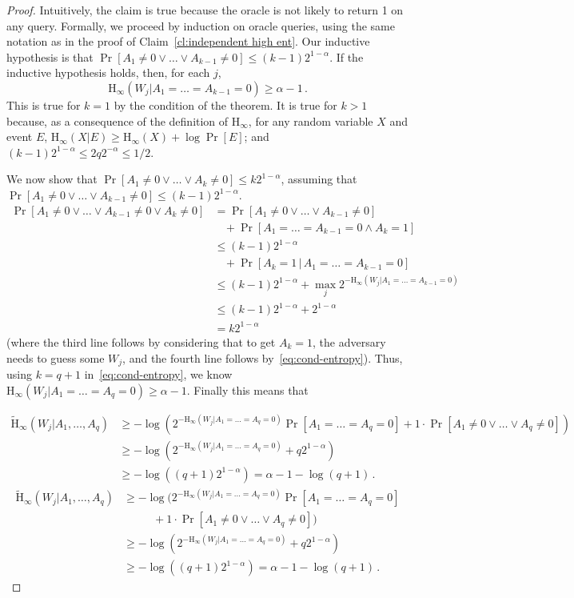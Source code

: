 \documentclass[11pt]{article}
\newcommand{\clref}[1]{\mbox{Claim~\ref{#1}}}
\newcommand{\Hoo}{\mathrm{H}_\infty}
\newcommand{\Hav}{\tilde{\mathrm{H}}_\infty}
\begin{document}
\begin{proof}
Intuitively, the claim is true because the oracle is not likely to return 1 on any query. Formally, we proceed by induction on oracle queries,
using the same notation as in the proof of   \clref{cl:independent high ent}. Our inductive hypothesis is
that $\Pr[A_1\neq 0 \vee \dots \vee A_{k-1}\neq 0] \leq (k-1)2^{1-\alpha}$.  If the inductive hypothesis holds, then, for each $j$,
\begin{equation}
\label{eq:cond-entropy}
\Hoo(W_j | A_1= \dots= A_{k-1}=0) \ge \alpha-1\,.
\end{equation}
This is true for $k=1$ by the condition of the theorem. It is true for $k>1$ because, as a consequence of the definition of $\Hoo$,
for any random variable $X$ and event $E$, $\Hoo(X|E)\ge \Hoo(X)+\log\Pr[E]$; and $(k-1) 2^{1-\alpha}\leq 2 q 2^{-\alpha} \leq 1/2$.

We now show that $\Pr[A_1\neq 0 \vee \dots \vee A_{k}\neq 0] \leq k 2^{1-\alpha}$, assuming that $\Pr[A_1\neq 0 \vee \dots \vee A_{k-1}\neq 0] \leq (k-1)2^{1-\alpha}$.
\begin{align*}
\Pr[A_1\neq 0 \vee \dots \vee A_{k-1}\neq 0 \vee A_k\neq 0] & = 
\Pr[A_1\neq 0 \vee \dots \vee A_{k-1}\neq 0] \\
&\ \ \ \ +\Pr[A_1=\dots = A_{k-1}=0 \wedge A_k=1]\\
& \le  (k-1)2^{1-\alpha}\\
& \ \ \ \ +\Pr[A_k=1\,|\,A_1=\dots = A_{k-1}=0]\\
& \le  (k-1)2^{1-\alpha}+\max_j 2^{-\Hoo(W_j | A_1=\dots =A_{k-1}=0)}\\
& \le   (k-1)2^{1-\alpha}+ 2^{1-\alpha}\\
& =  k 2^{1-\alpha}
\end{align*}
(where the third line follows by considering that to get $A_k=1$, the adversary needs to guess some $W_j$, and the fourth line follows by~\eqref{eq:cond-entropy}).
Thus, using $k=q+1$ in~\eqref{eq:cond-entropy},
 we know $\Hoo(W_j | A_1= \dots= A_q=0) \ge \alpha-1$.  Finally this means that

\ifnum{}
\begin{align*}
\Hav(W_j | A_1,\dots, A_q) &\ge -\log \left( 2^{-\Hoo(W_j | A_1= \dots= A_q=0)}\Pr[A_1=\dots=A_q=0]+1\cdot \Pr[A_1\neq 0 \vee \dots \vee  A_q\neq 0] \right)\\
& \ge -\log \left(  2^{-\Hoo(W_j | A_1= \dots= A_q=0)}+q2^{1-\alpha} \right)\\
& \ge -\log \left(  (q+1) 2^{1-\alpha}\right) = \alpha-1-\log(q+1)\,.
\end{align*}
\else
\begin{align*}
\Hav(W_j | A_1,\dots, A_q) &\ge -\log ( 2^{-\Hoo(W_j | A_1= \dots= A_q=0)}\Pr[A_1=\dots=A_q=0]\\ &\ \ \ \ \ \ \ \ \ \ \ \  +1\cdot \Pr[A_1\neq 0 \vee \dots \vee  A_q\neq 0] )\\
& \ge -\log \left(  2^{-\Hoo(W_j | A_1= \dots= A_q=0)}+q2^{1-\alpha} \right)\\
& \ge -\log \left(  (q+1) 2^{1-\alpha}\right) = \alpha-1-\log(q+1)\,.
\end{align*}
\fi

\end{proof}
\end{document}
